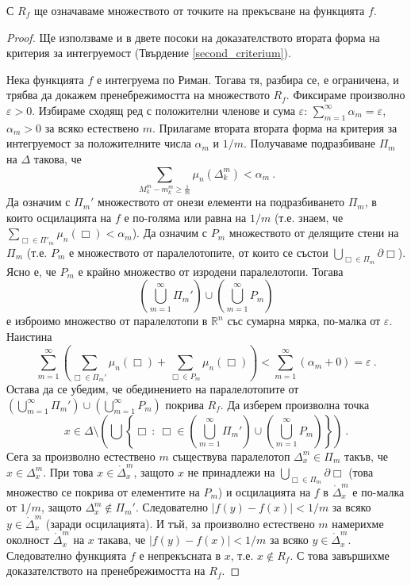 \documentclass[11pt]{article}
\numberwithin{equation}{section}
\numberwithin{figure}{section}
\numberwithin{table}{section}
\theoremstyle{plain}
\theoremstyle{definition}
\theoremstyle{remark}
\theoremstyle{definition}
\theoremstyle{remark}
\theoremstyle{plain}
\theoremstyle{definition}
\theoremstyle{definition}
\theoremstyle{plain}
\theoremstyle{plain}
\theoremstyle{plain}
\theoremstyle{definition}
\theoremstyle{plain}
\newcommand*{\R}{\mathbb{R}}
\begin{document}
С $R_f$ ще означаваме множеството от точките на прекъсване на функцията $f$.
\medskip

\begin{proof}
Ще използваме и в двете посоки на доказателството втората форма на критерия за интегруемост (Твърдение \ref{second_criterium}).

Нека функцията $f$ е интегруема по Риман. Тогава тя, разбира се, е ограничена, и трябва да докажем пренебрежимостта на множеството $R_f$. Фиксираме произволно $\varepsilon >0$. Избираме сходящ ред с положителни членове и сума $\varepsilon$: $\sum_{m=1}^\infty \alpha_m =\varepsilon$, $\alpha_m >0$ за всяко естествено $m$. Прилагаме втората втората форма на критерия за интегруемост за положителните числа $\alpha_m$ и $1/m$. Получаваме подразбиване $\Pi_m$ на $\Delta$ такова, че
$$\sum_{M_k^m-m_k^m\geq \frac{1}{m}}\mu_n(\Delta_k^m)<\alpha_m \ .$$
Да означим с $\Pi_m'$ множеството от онези елементи на подразбиването $\Pi_m$, в които осцилацията на $f$ е по-голяма или равна на $1/m$ (т.е. знаем, че $\sum_{\Box\in \Pi'_m}\mu_n(\Box)<\alpha_m$). Да означим с $P_m$ множеството от делящите стени на $\Pi_m$ (т.е. $P_m$ е множеството от паралелотопите, от които се състои $\bigcup_{\Box\in \Pi_m}\partial \Box$). Ясно е, че $P_m$ е крайно множество от изродени паралелотопи. Тогава
$$\left(\bigcup_{m=1}^\infty \Pi_m'\right)\cup \left(\bigcup_{m=1}^\infty P_m\right)$$
е изброимо множество от паралелотопи в $\R^n$ със сумарна мярка, по-малка от $\varepsilon$. Наистина
$$\sum_{m=1}^\infty\left(\sum_{\Box\in \Pi_m'}\mu_n(\Box) +\sum_{\Box\in P_m}\mu_n(\Box)\right)< \sum_{m=1}^\infty (\alpha_m +0)=\varepsilon \ .$$
Остава да се убедим, че обединението на паралелотопите от $\left(\bigcup_{m=1}^\infty \Pi_m'\right)\cup \left(\bigcup_{m=1}^\infty P_m\right)$ покрива $R_f$. Да изберем произволна точка
$$x\in \Delta\setminus \left(\bigcup\left\{\Box \ : \ \Box\in\left(\bigcup_{m=1}^\infty \Pi_m'\right)\cup \left(\bigcup_{m=1}^\infty P_m\right)\right\}\right) \ .$$
Сега за произволно естествено $m$ съществува паралелотоп $\Delta^m_x \in \Pi_m$ такъв, че $x\in \Delta^m_x$. При това $x\in \mathring \Delta^m_x$, защото $x$ не принадлежи на $\bigcup_{\Box\in \Pi_m}\partial \Box$ (това множество се покрива от елементите на $P_m$) и осцилацията на $f$ в $\mathring \Delta^m_x$ е по-малка от $1/m$, защото $\Delta^m_x\not\in \Pi_m'$. Следователно $|f(y)-f(x)|<1/m$ за всяко $y\in \mathring \Delta^m_x$ (заради осцилацията). И тъй, за произволно естествено $m$ намерихме околност $\mathring \Delta^m_x$ на $x$ такава, че $|f(y)-f(x)|<1/m$ за всяко $y\in \mathring \Delta^m_x$. Следователно функцията $f$ е непрекъсната в $x$, т.е. $x\not \in R_f$. С това завършихме доказателството на пренебрежимостта на $R_f$.
\medskip


\end{proof}
\end{document}
